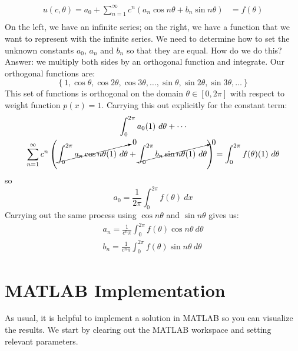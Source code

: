 \begin{align*}
u(c,\theta) = a_0 + \sum\limits_{n=1}^{\infty} c^n\left(a_n \cos{n \theta} + b_n \sin{n \theta}\right) &= f(\theta) \\
\end{align*}
On the left, we have an infinite series; on the right, we have a function that we want to represent with the infinite series.  We need to determine how to set the unknown constants $a_0$, $a_n$ and $b_n$ so that they are equal.  How do we do this?  Answer: we multiply both sides by an orthogonal function and integrate.  Our orthogonal functions are:
\begin{equation*}
\left\{1, \cos{\theta}, \cos{2 \theta}, \cos{3 \theta}, \dots, \sin{\theta}, \sin{2 \theta}, \sin{3 \theta},\dots \right\}
\end{equation*}
This set of functions is orthogonal on the domain $\theta \in [0,2\pi]$ with respect to weight function $p(x)=1$.  Carrying this out explicitly for the constant term:
\begin{multline*}
\int_0^{2\pi} a_0 (1) \ d\theta + \cdots \\ \sum\limits_{n=1}^{\infty} c^n \left(\cancelto{0}{ \int_0^{2\pi} a_n \cos{n \theta}(1) \ d\theta} + \cancelto{0}{\int_{0}^{2\pi} b_n \sin{n \theta}(1) \ d\theta} \right) = \int_0^{2 \pi} f(\theta) (1) \ d\theta 
\end{multline*}
so
\begin{equation*}
a_0 = \frac{1}{2\pi}\int_{0}^{2\pi} f(\theta) \ dx
\end{equation*}
Carrying out the same process using $\cos{n \theta}$ and $\sin{n \theta}$ gives us:
\begin{align}
a_n = \frac{1}{c^n \pi} \int_0^{2 \pi} f(\theta) \cos{n \theta} \ d\theta \\
b_n = \frac{1}{c^n \pi} \int_0^{2 \pi} f(\theta) \sin{n \theta} \ d\theta
\end{align}

\section{MATLAB Implementation}
As usual, it is helpful to implement a solution in MATLAB so you can visualize the results.  We start by clearing out the MATLAB workspace and setting relevant parameters.

